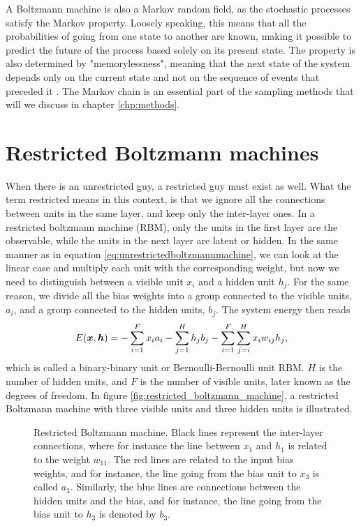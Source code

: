 A Boltzmann machine is also a Markov random field, as the stochastic processes satisfy the Markov property. Loosely speaking, this means that all the probabilities of going from one state to another are known, making it possible to predict the future of the process based solely on its present state. The property is also determined by "memorylessness", meaning that the next state of the system depends only on the current state and not on the sequence of events that preceded it \cite{fischer_training_2014}. The Markov chain is an essential part of the sampling methods that will we discuss in chapter \ref{chp:methods}.

\section{Restricted Boltzmann machines} \label{sec:RBM}
When there is an unrestricted guy, a restricted guy must exist as well. What the term restricted means in this context, is that we ignore all the connections between units in the same layer, and keep only the inter-layer ones. In a restricted boltzmann machine (RBM), only the units in the first layer are the observable, while the units in the next layer are latent or hidden. In the same manner as in equation \eqref{eq:unrestrictedboltzmannmachine}, we can look at the linear case and multiply each unit with the corresponding weight, but now we need to distinguish between a visible unit $x_i$ and a hidden unit $h_j$. For the same reason, we divide all the bias weights into a group connected to the visible units, $a_i$, and a group connected to the hidden units, $b_j$. The system energy then reads
\begin{equation}
E(\boldsymbol{{x}},\boldsymbol{{h}})=- \sum_{i=1}^Fx_ia_i- \sum_{j=1}^Hh_jb_j-\sum_{i=1}^F\sum_{j=i}^H x_iw_{ij}h_j,
\label{eq:binarybinary}
\end{equation}
which is called a binary-binary unit or Bernoulli-Bernoulli unit RBM. $H$ is the number of hidden units, and $F$ is the number of visible units, later known as the degrees of freedom. In figure \eqref{fig:restricted_boltzmann_machine}, a restricted Boltzmann machine with three visible units and three hidden units is illustrated.

\begin{figure}
	\centering
	
	\caption{Restricted Boltzmann machine. Black lines represent the inter-layer connections, where for instance the line between $x_1$ and $h_1$ is related to the weight $w_{11}$. The red lines are related to the input bias weights, and for instance, the line going from the bias unit to $x_3$ is called $a_3$. Similarly, the blue lines are connections between the hidden units and the bias, and for instance, the line going from the bias unit to $h_3$ is denoted by $b_3$.}
	\label{fig:restricted_boltzmann_machine}
\end{figure}

